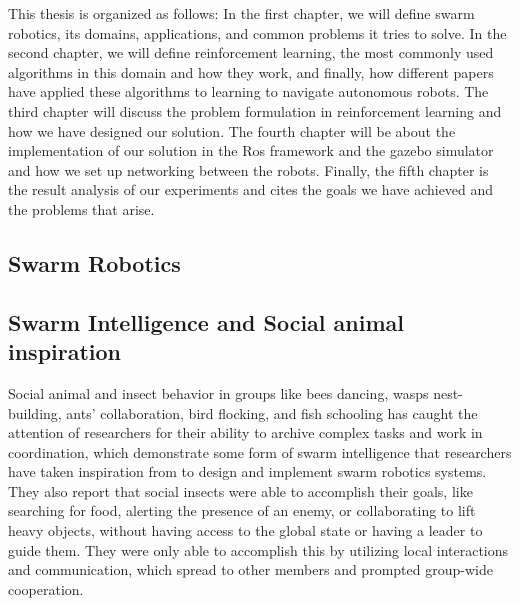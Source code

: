 \documentclass[12pt]{extarticle}
\begin{document}
This thesis is organized as follows: In the first chapter, we will define swarm robotics, its domains, applications, and common problems it tries to solve.
In the second chapter, we will define reinforcement learning, the most commonly used algorithms in this domain and how they work, and finally, how different papers have applied these algorithms to learning to navigate autonomous robots.
\pagebreak The third chapter will discuss the problem formulation in reinforcement learning and how we have designed our solution.
The fourth chapter will be about the implementation of our solution in the Ros framework and the gazebo simulator and how we set up networking between the robots.
Finally, the fifth chapter is the result analysis of our experiments and cites the goals we have achieved and the problems that arise.

   


  
 
 




\newpage
\pagebreak
\hspace{0pt}
\vfill
\begin{center}
\section{Swarm Robotics}
\end{center}
\vfill
\hspace{0pt}
\pagebreak




                  
\subsection{Swarm Intelligence and Social animal inspiration}
Social animal and insect behavior in groups like bees dancing, wasps nest-building, ants' collaboration, bird flocking, and fish schooling has caught the attention of researchers for their ability to archive complex tasks and work in coordination, which demonstrate some form of swarm intelligence that researchers have taken inspiration from to design and implement swarm robotics systems. \cite{navarro2013introduction}
They also report that social insects were able to accomplish their goals, like searching for food, alerting the presence of an enemy, or collaborating to lift heavy objects, without having access to the global state or having a leader to guide them. They were only able to accomplish this by utilizing local interactions and communication, which spread to other members and prompted group-wide cooperation. \cite{navarro2013introduction}
\end{document}

